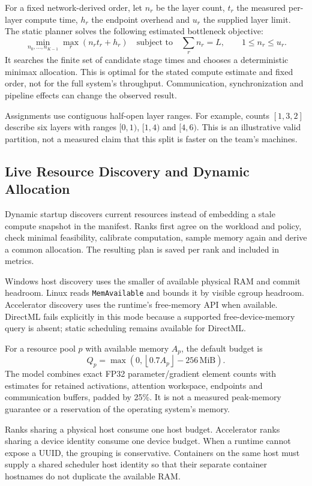 For a fixed network-derived order, let $n_r$ be the layer count, $t_r$ the measured per-layer compute time, $h_r$ the endpoint overhead and $u_r$ the supplied layer limit. The static planner solves the following estimated bottleneck objective:
\[
  \min_{n_0,\ldots,n_{K-1}}\max_r(n_rt_r+h_r)
  \quad\text{subject to}\quad
  \sum_r n_r=L,\qquad 1\leq n_r\leq u_r.
\]
It searches the finite set of candidate stage times and chooses a deterministic minimax allocation. This is optimal for the stated compute estimate and fixed order, not for the full system's throughput. Communication, synchronization and pipeline effects can change the observed result.

Assignments use contiguous half-open layer ranges. For example, counts $[1,3,2]$ describe six layers with ranges $[0,1)$, $[1,4)$ and $[4,6)$. This is an illustrative valid partition, not a measured claim that this split is faster on the team's machines.

\subsection{Live Resource Discovery and Dynamic Allocation}

Dynamic startup discovers current resources instead of embedding a stale compute snapshot in the manifest. Ranks first agree on the workload and policy, check minimal feasibility, calibrate computation, sample memory again and derive a common allocation. The resulting plan is saved per rank and included in metrics.

Windows host discovery uses the smaller of available physical RAM and commit headroom. Linux reads \texttt{MemAvailable} and bounds it by visible cgroup headroom. Accelerator discovery uses the runtime's free-memory API when available. DirectML fails explicitly in this mode because a supported free-device-memory query is absent; static scheduling remains available for DirectML.

For a resource pool $p$ with available memory $A_p$, the default budget is
\[
  Q_p=\max\left(0,\left\lfloor0.7A_p\right\rfloor-256\,\mathrm{MiB}\right).
\]
The model combines exact FP32 parameter/gradient element counts with estimates for retained activations, attention workspace, endpoints and communication buffers, padded by 25\%. It is not a measured peak-memory guarantee or a reservation of the operating system's memory.

Ranks sharing a physical host consume one host budget. Accelerator ranks sharing a device identity consume one device budget. When a runtime cannot expose a UUID, the grouping is conservative. Containers on the same host must supply a shared scheduler host identity so that their separate container hostnames do not duplicate the available RAM.

